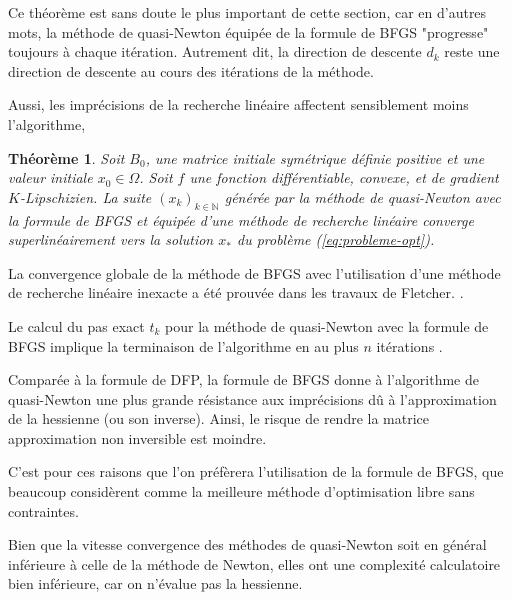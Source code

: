\documentclass[3p, twocolumn]{elsarticle}
\newtheorem{thm}{Théorème}
\begin{document}
Ce théorème est sans doute le plus important de cette section, car en d'autres mots, la méthode de quasi-Newton équipée de la formule de BFGS "progresse" toujours à chaque itération. Autrement dit, la direction de descente $d_k$ reste une direction de descente au cours des itérations de la méthode. 

Aussi, les imprécisions de la recherche linéaire affectent sensiblement moins l'algorithme, 

\begin{thm}
    Soit $B_0$, une matrice initiale symétrique définie positive et une valeur initiale $x_0\in\Omega$. Soit $f$ une fonction différentiable, convexe, et de gradient $K$-Lipschizien. La suite $(x_k)_{k\in \mathbb{N}}$ générée par la méthode de quasi-Newton avec la formule de BFGS et équipée d'une méthode de recherche linéaire converge superlinéairement vers la solution $x_*$ du problème (\ref{eq:probleme-opt}).
\end{thm}
\begin{pf}
    La convergence globale de la méthode de BFGS avec l'utilisation d'une méthode de recherche linéaire inexacte a été prouvée dans les travaux de Fletcher. \cite{book:Fletcher_1987}.
\end{pf}

\begin{rmk}
    Le calcul du pas exact $t_k$ pour la méthode de quasi-Newton avec la formule de BFGS implique la terminaison de l'algorithme en au plus $n$ itérations \cite{book:Fletcher_1987}.
\end{rmk}

Comparée à la formule de DFP, la formule de BFGS donne à l'algorithme de quasi-Newton une plus grande résistance aux imprécisions dû à l'approximation de la hessienne (ou son inverse). Ainsi, le risque de rendre la matrice approximation non inversible est moindre. 

C'est pour ces raisons que l'on préfèrera l'utilisation de la formule de BFGS, que beaucoup considèrent comme la meilleure méthode d'optimisation libre sans contraintes.

Bien que la vitesse convergence des méthodes de quasi-Newton soit en général inférieure à celle de la méthode de Newton, elles ont une complexité calculatoire bien inférieure, car on n'évalue pas la hessienne. 
\end{document}
